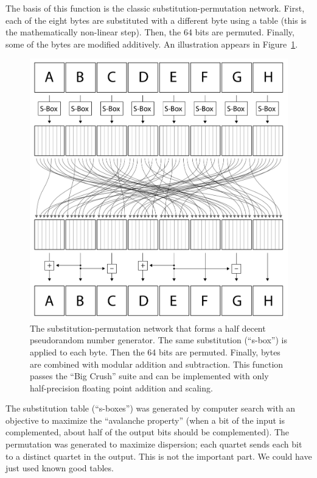 \documentclass[twocolumn]{article}
\begin{document}
The basis of this function is the classic substitution-permutation
network. First, each of the eight bytes are substituted with a
different byte using a table (this is the mathematically non-linear
step). Then, the 64 bits are permuted. Finally, some of the bytes are
modified additively. An illustration appears in Figure~\ref{fig:cipher}.

\begin{figure}
\includegraphics[width=\linewidth]{cipher}
\caption{The substitution-permutation network that forms a half decent
  pseudorandom number generator. The same substitution (``s-box'') is
  applied to each byte. Then the 64 bits are permuted. Finally, bytes
  are combined with modular addition and subtraction. This function
  passes the ``Big Crush'' suite and can be implemented with only
  half-precision floating point addition and scaling.
} \label{fig:cipher}
\end{figure}

The substitution table (``s-boxes'') was generated by computer search
with an objective to maximize the ``avalanche property'' (when a bit
of the input is complemented, about half of the output bits should be
complemented). The permutation was generated to maximize dispersion;
each quartet sends each bit to a distinct quartet in the output. This
is not the important part. We could have just used known good tables.
\end{document}
